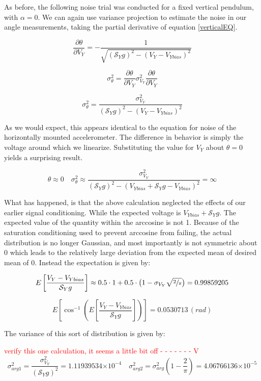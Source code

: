 \documentclass{article}
\newcommand{\xxx}[1]{\textcolor{red}{#1}}
\theoremstyle{plain}
\theoremstyle{definition}
\theoremstyle{remark}
\newcommand{\Sens}{\mathcal{S}}
\providecommand{\e}[1]{\ensuremath{\times 10^{#1}}}
\begin{document}
As before, the following noise trial was conducted for a fixed vertical pendulum, with $\alpha = 0$. We can again use variance projection to estimate the noise in our angle measurements, taking the partial derivative of equation \ref{verticalEQ}.

$$ \frac{\partial \theta}{\partial V_{Y}} = -\frac{1}{\sqrt{(\Sens_{Y} g)^2 - (V_{Y} - V_{Ybias})^2}}$$

$$ \sigma^2_{\theta} = \frac{\partial \theta}{\partial V_{Y}} \sigma^2_{V_{Y}} \frac{\partial \theta}{\partial V_{Y}} $$

$$ \sigma^2_{\theta} = \frac{\sigma^2_{V_{Y}}}{(\Sens_{Y} g)^2 - (V_{Y} - V_{Ybias})^2}$$

As we would expect, this appears identical to the equation for noise of the horizontally mounted accelerometer.  The difference in behavior is simply the voltage around which we linearize.  Substituting the value for $V_{Y}$ about $\theta = 0$  yields a surprising result.


$$ \theta \approx 0 \quad \sigma^2_{\theta} \approx \frac{\sigma^2_{V_{Y}}}{(\Sens_{Y} g)^2 - (V_{Ybias} + \Sens_{Y} g - V_{Ybias})^2} = \infty$$

What has happened, is that the above calculation neglected the effects of our earlier signal conditioning.  While the expected voltage is $V_{Ybias} + \Sens_Y g$.  The expected value of the quantity within the arccosine is not 1.  Because of the saturation conditioning used to prevent arccosine from failing, the actual distribution is no longer Gaussian, and most importantly is not symmetric about 0 which leads to the relatively large deviation from the expected mean of desired mean of 0.  Instead the expectation is given by:

$$ E \left[ \frac{V_{Y} - V_{Ybias}}{\Sens_{Y} g} \right] \approx 0.5 \cdot 1 + 0.5 \cdot \big(1 - \sigma_{V_Y} \sqrt{\sfrac{2}{\pi}} \big) = 0.99859205 $$

$$ E\left[ \cos^{-1} \left(  E \left[ \frac{V_{Y} - V_{Ybias}}{\Sens_{Y} g} \right]  \right)  \right] = 0.0530713 \, (rad) $$

The variance of this sort of distribution is given by: 

\xxx{verify this one calculation, it seems a little bit off - - - - - - -   V}
$$ \sigma_{arg1}^2 = \frac{\sigma^2_{V_Y}}{(\Sens_Y g)^2} = 1.11939534 \e{-4} \quad \sigma_{arg2}^2 = \sigma_{arg}^2 \left(1 - \frac{2}{\pi} \right) = 4.06766136 \e{-5}$$
\end{document}
